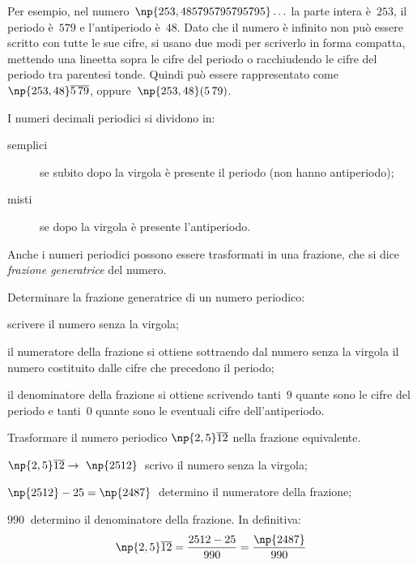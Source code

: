 Per esempio, nel numero~$\np{253,485795795795795}\ldots$ la parte intera è~$253$, il periodo è~$579$ e l'antiperiodo è~$48$.
Dato che il numero è infinito non può essere scritto con tutte le sue cifre, si usano due modi per scriverlo in
forma compatta, mettendo una lineetta sopra le cifre del periodo o racchiudendo le cifre del periodo tra
parentesi tonde. Quindi può essere rappresentato come~$\np{253,48}\overline{5\,79}$, oppure~$\np{253,48}(5\,79)$.

I numeri decimali periodici si dividono in:
\begin{description}
 \item [semplici] se subito dopo la virgola è presente il periodo (non hanno antiperiodo);
 \item [misti] se dopo la virgola è presente l'antiperiodo.
\end{description}

Anche i numeri periodici possono essere trasformati in una frazione, che si
dice \emph{frazione generatrice} del numero.

\begin{procedura}
 Determinare la frazione generatrice di un numero periodico:
\begin{enumeratea}
\item scrivere il numero senza la virgola;
\item il numeratore della frazione si ottiene sottraendo dal numero senza la virgola il numero
	 costituito dalle cifre che precedono il periodo;
\item il denominatore della frazione si ottiene scrivendo tanti~$9$ quante sono le cifre del periodo e
	 tanti~$0$ quante sono le eventuali cifre dell'antiperiodo.
\end{enumeratea}
\end{procedura}

\begin{exrig}
 \begin{esempio}
 Trasformare il numero periodico $\np{2,5}\overline{12}$ nella frazione equivalente.
  \begin{enumeratea}
  \item $\np{2,5}\overline{12}\rightarrow~\np{2512}\:$ scrivo il numero senza la virgola; %
  \item $\np{2512}-25=\np{2487}\:$ determino il numeratore della frazione; %
  \item $990\:$ determino il denominatore della frazione. In definitiva:
  \[\np{2,5}\overline{12}=\frac{2512-25}{990}=\dfrac{\np{2487}}{990}\]
  \end{enumeratea}
 \end{esempio}
\end{exrig}

